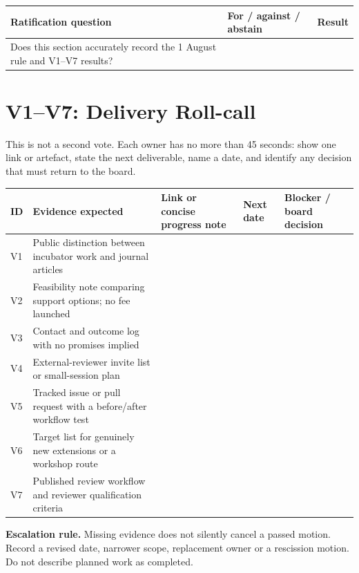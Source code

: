 \documentclass[11pt]{article}
\begin{document}
\begin{center}\small\sffamily
\begin{tabular}{@{}p{8.7cm}p{2.5cm}p{2.5cm}@{}}
\toprule
\textbf{Ratification question} & \textbf{For / against / abstain} & \textbf{Result} \\
\midrule
Does this section accurately record the 1 August rule and V1--V7 results? & & \\[9pt]
\bottomrule
\end{tabular}
\end{center}

\section{V1--V7: Delivery Roll-call}

This is not a second vote. Each owner has no more than 45 seconds: show one link or artefact, state the next deliverable, name a date, and identify any decision that must return to the board.

{\footnotesize\renewcommand{\arraystretch}{1.2}
\begin{longtable}{@{}p{0.7cm}p{3.75cm}p{4.7cm}p{2.1cm}p{2.75cm}@{}}
\toprule
\textbf{ID} & \textbf{Evidence expected} & \textbf{Link or concise progress note} & \textbf{Next date} & \textbf{Blocker / board decision} \\
\midrule
\endhead
\bottomrule
\endlastfoot
V1 & Public distinction between incubator work and journal articles & & & \\[12pt]
V2 & Feasibility note comparing support options; no fee launched & & & \\[12pt]
V3 & Contact and outcome log with no promises implied & & & \\[12pt]
V4 & External-reviewer invite list or small-session plan & & & \\[12pt]
V5 & Tracked issue or pull request with a before/after workflow test & & & \\[12pt]
V6 & Target list for genuinely new extensions or a workshop route & & & \\[12pt]
V7 & Published review workflow and reviewer qualification criteria & & & \\[12pt]
\end{longtable}}

\begin{warnbox}
\textbf{Escalation rule.} Missing evidence does not silently cancel a passed motion. Record a revised date, narrower scope, replacement owner or a rescission motion. Do not describe planned work as completed.
\end{warnbox}
\end{document}
